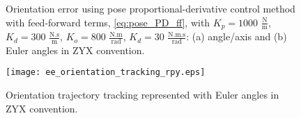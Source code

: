 \begin{figure}
    \centering
    \hfill
    \caption{Orientation error using pose proportional-derivative control method with feed-forward terms, \eqref{eq:pose_PD_ff}, with  ${K_{p}}=1000$ $\mathrm{\frac{N}{m}}$, $K_{d}= 300$ $\mathrm{\frac{N.s}{m}}$, ${K_{o}}=800$ $\mathrm{\frac{N.m}{rad}}$, $K_{d}= 30$ $\mathrm{\frac{N.m.s}{rad}}$: (a) angle/axis and (b) Euler angles in ZYX convention.}
    \label{fig:act_3.2_ee_orientation_error}
\end{figure}

\begin{figure}
	\centering
	\texttt{[image: ee\_orientation\_tracking\_rpy.eps]}
    \caption{Orientation trajectory tracking represented with Euler angles in ZYX convention.}
    \label{fig:act_3.2_ee_orientation_tracking_rpy}	
\end{figure}

